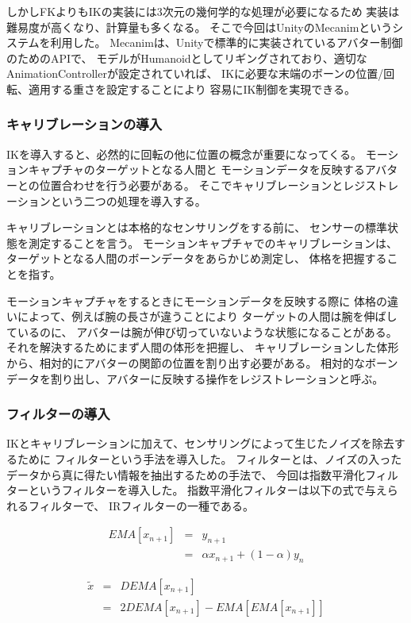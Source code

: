 \documentclass[a4j]{jsarticle}
\begin{document}
しかしFKよりもIKの実装には3次元の幾何学的な処理が必要になるため
実装は難易度が高くなり、計算量も多くなる。
そこで今回はUnityのMecanimというシステムを利用した。
Mecanimは、Unityで標準的に実装されているアバター制御のためのAPIで、
モデルがHumanoidとしてリギングされており、適切なAnimationControllerが設定されていれば、
IKに必要な末端のボーンの位置/回転、適用する重さを設定することにより
容易にIK制御を実現できる。


\subsubsection{キャリブレーションの導入}

IKを導入すると、必然的に回転の他に位置の概念が重要になってくる。
モーションキャプチャのターゲットとなる人間と
モーションデータを反映するアバターとの位置合わせを行う必要がある。
そこでキャリブレーションとレジストレーションという二つの処理を導入する。

キャリブレーションとは本格的なセンサリングをする前に、
センサーの標準状態を測定することを言う。
モーションキャプチャでのキャリブレーションは、
ターゲットとなる人間のボーンデータをあらかじめ測定し、
体格を把握することを指す。

モーションキャプチャをするときにモーションデータを反映する際に
体格の違いによって、例えば腕の長さが違うことにより
ターゲットの人間は腕を伸ばしているのに、
アバターは腕が伸び切っていないような状態になることがある。
それを解決するためにまず人間の体形を把握し、
キャリブレーションした体形から、相対的にアバターの関節の位置を割り出す必要がある。
相対的なボーンデータを割り出し、アバターに反映する操作をレジストレーションと呼ぶ。

\subsubsection{フィルターの導入}

IKとキャリブレーションに加えて、センサリングによって生じたノイズを除去するために
フィルターという手法を導入した。
フィルターとは、ノイズの入ったデータから真に得たい情報を抽出するための手法で、
今回は指数平滑化フィルターというフィルターを導入した。
指数平滑化フィルターは以下の式で与えられるフィルターで、
IRフィルターの一種である。

\begin{eqnarray*}
EMA[x_{n+1}] &=& y_{n+1} \\
             &=& \alpha x_{n+1} + (1-\alpha)y_{n}
\end{eqnarray*}

\begin{eqnarray*}
\tilde{x} &=& DEMA[x_{n+1}] \\
          &=& 2DEMA[x_{n+1}]-EMA[EMA[x_{n+1}]]
\end{eqnarray*}
\end{document}
